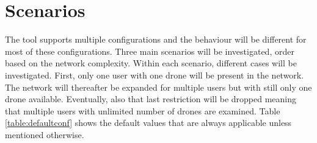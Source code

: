 \chapter{Scenarios}
\label{chap:scenarios}
The tool supports multiple configurations and the behaviour will be different for most of these configurations. Three main scenarios 
will be investigated, order based on the network complexity. Within each scenario, different cases will be investigated.
First, only one user with one drone will be present in the network. The network will thereafter be expanded
for multiple users but with still only one drone available. Eventually, also that last restriction will be dropped meaning 
that multiple users with unlimited number of drones are examined. 
Table \ref{table:defaultconf} shows the default values that are always applicable unless mentioned otherwise.

